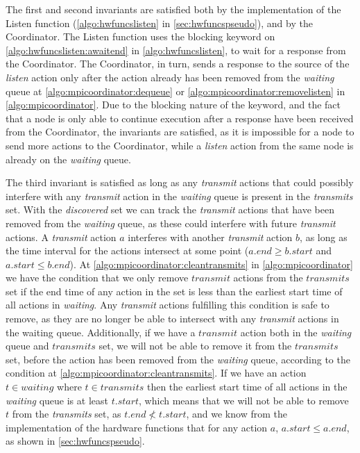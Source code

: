 The first and second invariants are satisfied both by the implementation of the Listen function
(\autoref{algo:hwfuncslisten} in \autoref{sec:hwfuncspseudo}), and by the Coordinator. The Listen function
uses the blocking \KwAwait keyword on \autoref{algo:hwfuncslisten:awaitend} in \autoref{algo:hwfuncslisten},
to wait for a response from the Coordinator. The Coordinator, in turn, sends a response to the source of the
\textit{listen} action only after the action already has been removed from the \textit{waiting} queue at
\autoref{algo:mpicoordinator:dequeue} or \autoref{algo:mpicoordinator:removelisten} in
\autoref{algo:mpicoordinator}. Due to the blocking nature of the \KwAwait keyword, and the fact that a node is
only able to continue execution after a response have been received from the Coordinator, the invariants are
satisfied, as it is impossible for a node to send more actions to the Coordinator, while a \textit{listen}
action from the same node is already on the \textit{waiting} queue.
\smallbreak

The third invariant is satisfied as long as any \textit{transmit} actions that could possibly interfere with
any \textit{transmit} action in the \textit{waiting} queue is present in the \textit{transmits} set. With the
\textit{discovered} set we can track the \textit{transmit} actions that have been removed from the
\textit{waiting} queue, as these could interfere with future \textit{transmit} actions. A \textit{transmit}
action $a$ interferes with another \textit{transmit} action $b$, as long as the time interval for the actions
intersect at some point ($a.\mathit{end} \geq b.\mathit{start}$ and $a.\mathit{start} \leq b.\mathit{end}$).
At \autoref{algo:mpicoordinator:cleantransmits} in \autoref{algo:mpicoordinator} we have the condition that we
only remove $\mathit{transmit}$ actions from the $\mathit{transmits}$ set if the end time of any action in the
set is less than the earliest start time of all actions in \textit{waiting}. Any \textit{transmit} actions
fulfilling this condition is safe to remove, as they are no longer be able to intersect with any
\textit{transmit} actions in the waiting queue. Additionally, if we have a $\mathit{transmit}$ action both in
the \textit{waiting} queue and $\mathit{transmits}$ set, we will not be able to remove it from the
$\mathit{transmits}$ set, before the action has been removed from the \textit{waiting} queue, according to
the condition at \autoref{algo:mpicoordinator:cleantransmits}. If we have an action $t \in \mathit{waiting}$
where $t \in \mathit{transmits}$ then the earliest start time of all actions in the \textit{waiting} queue
is at least $t.\mathit{start}$, which means that we will not be able to remove $t$ from the \textit{transmits}
set, as $t.\mathit{end} \nless t.\mathit{start}$, and we know from the implementation of the hardware
functions that for any action $a$, $a.\mathit{start} \leq a.\mathit{end}$, as shown in
\autoref{sec:hwfuncspseudo}.


